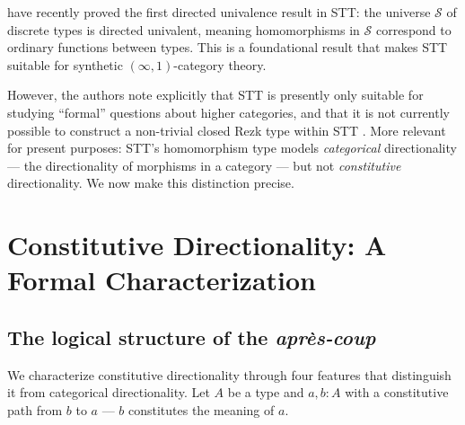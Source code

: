 \documentclass[12pt]{article}
\theoremstyle{definition}
\theoremstyle{remark}
\newcommand{\aprescoup}{\textit{apr\`{e}s-coup}}
\begin{document}
\cite{gratzer-weinberger-buchholtz2024} have recently proved the first directed univalence result in STT: the universe $\mathcal{S}$ of discrete types is directed univalent, meaning homomorphisms in $\mathcal{S}$ correspond to ordinary functions between types. This is a foundational result that makes STT suitable for synthetic $(\infty, 1)$-category theory.

However, the authors note explicitly that STT is presently only suitable for studying ``formal'' questions about higher categories, and that it is not currently possible to construct a non-trivial closed Rezk type within STT \cite{gratzer-weinberger-buchholtz2024}. More relevant for present purposes: STT's homomorphism type models \textit{categorical} directionality --- the directionality of morphisms in a category --- but not \textit{constitutive} directionality. We now make this distinction precise.

\section{Constitutive Directionality: A Formal Characterization}

\subsection{The logical structure of the \aprescoup{}}

We characterize constitutive directionality through four features that distinguish it from categorical directionality. Let $A$ be a type and $a, b : A$ with a constitutive path from $b$ to $a$ --- $b$ constitutes the meaning of $a$.
\end{document}
